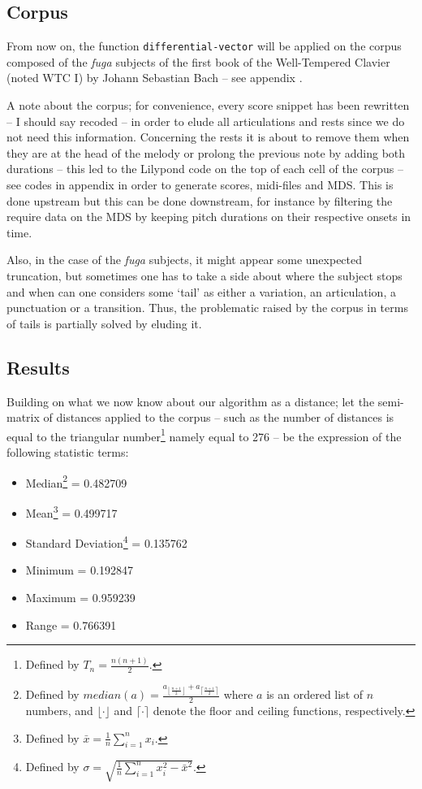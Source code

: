  \subsection{Corpus}
 
 From now on, the function \texttt{differential-vector} will be applied on the corpus composed of the \textit{fuga} subjects of the first book of the Well-Tempered Clavier (noted WTC I) by Johann Sebastian Bach -- see appendix .

\smallskip

A note about the corpus; for convenience, every score snippet has been rewritten -- I should say recoded -- in order to elude all articulations and rests since we do not need this information. Concerning the rests it is about to remove them when they are at the head of the melody or prolong the previous note by adding both durations -- this led to the Lilypond code on the top of each cell of the corpus -- see codes in appendix  in order to generate scores, midi-files and MDS. This is done upstream but this can be done downstream, for instance by filtering the require data on the MDS by keeping pitch durations on their respective onsets in time. 

\smallskip

Also, in the case of the \textit{fuga} subjects, it might appear some unexpected truncation, but sometimes one has to take a side about where the subject stops and when can one considers some `tail' as either a variation, an articulation, a punctuation or a transition. Thus, the problematic raised by the corpus in terms of tails is partially solved by eluding it.

\subsection{Results}

Building on what we now know about our algorithm as a distance; let the semi-matrix of distances applied to the corpus -- such as the number of distances is equal to the triangular number\footnote{Defined by $T_n=\displaystyle\frac{n(n+1)}{2}$.} namely equal to 276 -- be the expression of the following statistic terms:

\begin{itemize}
\item[] Median\footnote{Defined by $median(a)=\displaystyle\frac{a_{\left \lfloor{\frac{n+1}{2}}\right \rfloor } + a_{\left \lceil{\frac{n+1}{2}}\right \rceil }}{2}$ where $a$ is an ordered list of $n$ numbers, and $\displaystyle \lfloor \cdot \rfloor$  and $\displaystyle \lceil \cdot \rceil$  denote the floor and ceiling functions, respectively.}  = 0.482709
\item[] Mean\footnote{Defined by $\bar{x}=\displaystyle\frac{1}{n}\sum_{i=1}^n x_i$.}  = 0.499717
\item[] Standard Deviation\footnote{Defined by $\sigma=\displaystyle\sqrt{\frac{1}{n}\sum_{i=1}^n x^2_i - \bar{x}^2}$.}  =  0.135762
\item[] Minimum = 0.192847 
\item[] Maximum = 0.959239
\item[] Range = 0.766391
\end{itemize}

